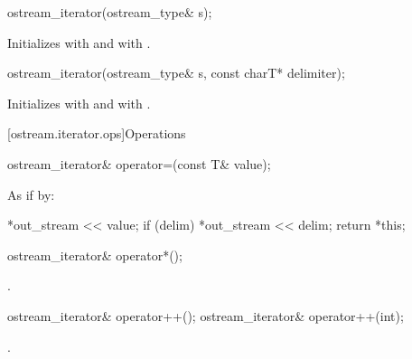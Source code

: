 %
\begin{itemdecl}
ostream_iterator(ostream_type& s);
\end{itemdecl}

\begin{itemdescr}
\pnum
\effects
Initializes  with  and
 with .
\end{itemdescr}


%
\begin{itemdecl}
ostream_iterator(ostream_type& s, const charT* delimiter);
\end{itemdecl}

\begin{itemdescr}
\pnum
\effects
Initializes  with  and
 with .
\end{itemdescr}

[ostream.iterator.ops]{Operations}

\begin{indexed}{}
\begin{itemdecl}
ostream_iterator& operator=(const T& value);
\end{itemdecl}
\end{indexed}

\begin{itemdescr}
\pnum
\effects
As if by:
\begin{codeblock}
*out_stream << value;
if (delim)
  *out_stream << delim;
return *this;
\end{codeblock}
\end{itemdescr}

%
\begin{itemdecl}
ostream_iterator& operator*();
\end{itemdecl}

\begin{itemdescr}
\pnum
\returns
{}.
\end{itemdescr}

%
\begin{itemdecl}
ostream_iterator& operator++();
ostream_iterator& operator++(int);
\end{itemdecl}

\begin{itemdescr}
\pnum
\returns
{}.
\end{itemdescr}

